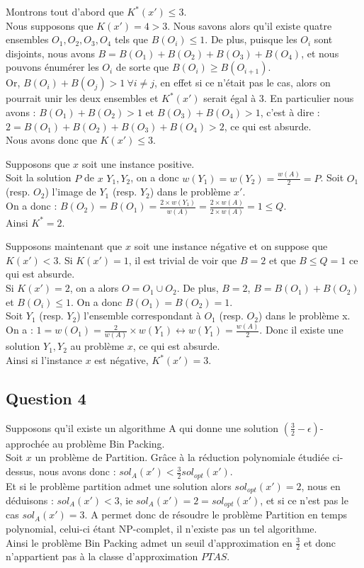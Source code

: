 Montrons tout d'abord que $K^*(x') \leq 3$.\\
Nous supposons que $K(x') = 4 > 3$. Nous savons alors qu'il existe quatre ensembles
$O_1,O_2,O_3,O_4$ tels que $B(O_i) \leq 1$.
De plus, puisque les $O_i$ sont disjoints, nous avons $B = B(O_1)+B(O_2)+B(O_3)+B(O_4)$,
et nous pouvons énumérer les $O_i$ de sorte que $B(O_i) \geq B(O_{i+1})$.\\
Or, $B(O_i) + B(O_j) > 1\ \forall i \neq j$, en effet si ce n'était pas le cas, alors on
pourrait unir les deux ensembles et $K^*(x')$ serait égal à 3.
En particulier nous avons : $B(O_1)+B(O_2) > 1$ et $B(O_3)+B(O_4) > 1$, c'est à dire :
$2 = B(O_1) + B(O_2) + B(O_3) + B(O_4) > 2$, ce qui est absurde.\\
Nous avons donc que $K(x') \leq 3$.

Supposons que $x$ soit une instance positive.\\
Soit la solution $P$ de $x$ $Y_1,Y_2$, on a donc $w(Y_1) = w(Y_2) = \frac{w(A)}{2} = P$.
Soit $O_1$ (resp. $O_2$) l'image de $Y_1$ (resp. $Y_2$) dans le problème $x'$.\\
On a donc : $B(O_2) = B(O_1) = \frac{2 \times w(Y_1)}{w(A)} = \frac{2 \times w(A)}{2
\times w(A)} = 1 \leq Q$.\\
Ainsi $K^* = 2$.

Supposons maintenant que $x$ soit une instance négative et on suppose que $K(x') < 3$.
Si $K(x') = 1$, il est trivial de voir que $B = 2$ et que $B \leq Q = 1$ ce qui est
absurde.\\
Si $K(x') = 2$, on a alors $O = O_1 \cup O_2$. 
De plus, $B = 2$, $B = B(O_1) + B(O_2)$ et $B(O_i) \leq 1$.
On a donc $B(O_1) = B(O_2) = 1$.\\
Soit $Y_1$ (resp. $Y_2$) l'ensemble correspondant à $O_1$ (resp. $O_2$) dans le problème
x. On a :
$1 = w(O_1) = \frac{2}{w(A)} \times w(Y_1) \leftrightarrow w(Y_1) = \frac{w(A)}{2}$.
Donc il existe une solution $Y_1,Y_2$ au problème $x$, ce qui est absurde.\\
Ainsi si l'instance $x$ est négative, $K^*(x') = 3$.

\subsection{Question 4}\label{ex10_q5}
Supposons qu'il existe un algorithme A qui donne une solution $(\frac{3}{2} -
\epsilon)$-approchée au problème Bin Packing.\\
Soit $x$ un problème de Partition.
Grâce à la réduction polynomiale étudiée ci-dessus, nous avons donc :
$sol_{A}(x') < \frac{3}{2}sol_{opt}(x')$.\\
Et si le problème partition admet une solution alors $sol_{opt}(x') = 2$, nous en
déduisons : $sol_{A}(x') < 3$, ie $sol_A(x') = 2 = sol_{opt}(x')$, et si ce n'est pas le
cas $sol_A(x') = 3$.
A permet donc de résoudre le problème Partition en temps polynomial, celui-ci étant
NP-complet, il n'existe pas un tel algorithme.\\
Ainsi le problème Bin Packing admet un seuil d'approximation en $\frac{3}{2}$ et donc 
n'appartient pas à la classe d'approximation $PTAS$.

